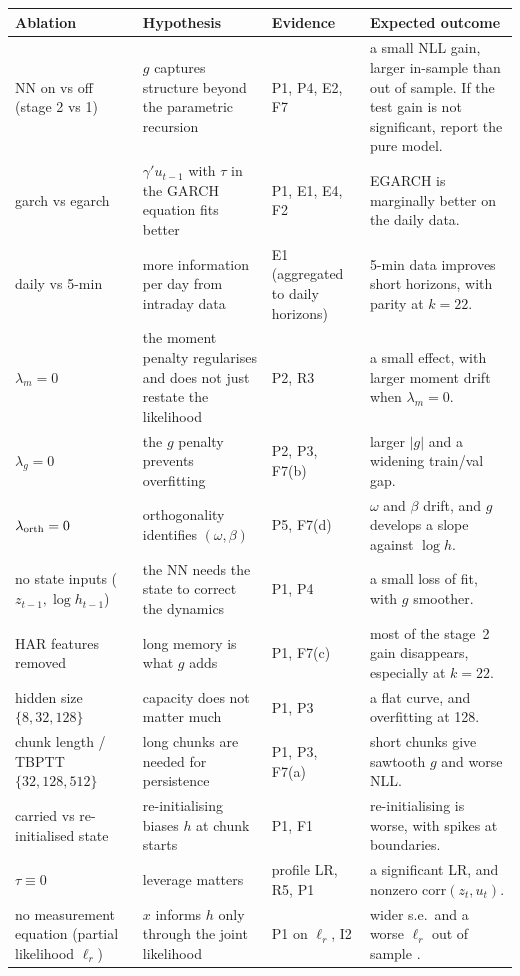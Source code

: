 \documentclass[11pt]{article}
\begin{document}
{\small
\begin{longtable}{p{3.1cm}p{4.8cm}p{2.1cm}p{4.5cm}}
\toprule
Ablation & Hypothesis & Evidence & Expected outcome\\
\midrule\endhead
NN on vs off (stage 2 vs 1) & $g$ captures structure beyond the parametric recursion & P1, P4, E2, F7 & a small NLL gain, larger in-sample than out of sample. If the test gain is not significant, report the pure model.\\
garch vs egarch & $\gamma'u_{t-1}$ with $\tau$ in the GARCH equation fits better \cite{HH2016} & P1, E1, E4, F2 & EGARCH is marginally better on the daily data.\\
daily vs 5-min & more information per day from intraday data & E1 (aggregated to daily horizons) & 5-min data improves short horizons, with parity at $k=22$.\\
$\lambda_m=0$ & the moment penalty regularises and does not just restate the likelihood & P2, R3 & a small effect, with larger moment drift when $\lambda_m=0$.\\
$\lambda_g=0$ & the $g$ penalty prevents overfitting & P2, P3, F7(b) & larger $|g|$ and a widening train/val gap.\\
$\lambda_{\rm orth}=0$ & orthogonality identifies $(\omega,\beta)$ & P5, F7(d) & $\omega$ and $\beta$ drift, and $g$ develops a slope against $\log h$.\\
no state inputs ($z_{t-1},\log h_{t-1}$) & the NN needs the state to correct the dynamics & P1, P4 & a small loss of fit, with $g$ smoother.\\
HAR features removed & long memory is what $g$ adds & P1, F7(c) & most of the stage~2 gain disappears, especially at $k=22$.\\
hidden size $\{8,32,128\}$ & capacity does not matter much & P1, P3 & a flat curve, and overfitting at 128.\\
chunk length / TBPTT $\{32,128,512\}$ & long chunks are needed for persistence & P1, P3, F7(a) & short chunks give sawtooth $g$ and worse NLL.\\
carried vs re-initialised state & re-initialising biases $h$ at chunk starts & P1, F1 & re-initialising is worse, with spikes at boundaries.\\
$\tau\equiv0$ & leverage matters & profile LR, R5, P1 & a significant LR, and nonzero $\mathrm{corr}(z_t,u_t)$.\\
no measurement equation (partial likelihood $\ell_r$) & $x$ informs $h$ only through the joint likelihood & P1 on $\ell_r$, I2 & wider s.e.\ and a worse $\ell_r$ out of sample \cite{HHS2012}.\\
\bottomrule
\end{longtable}}
\end{document}

